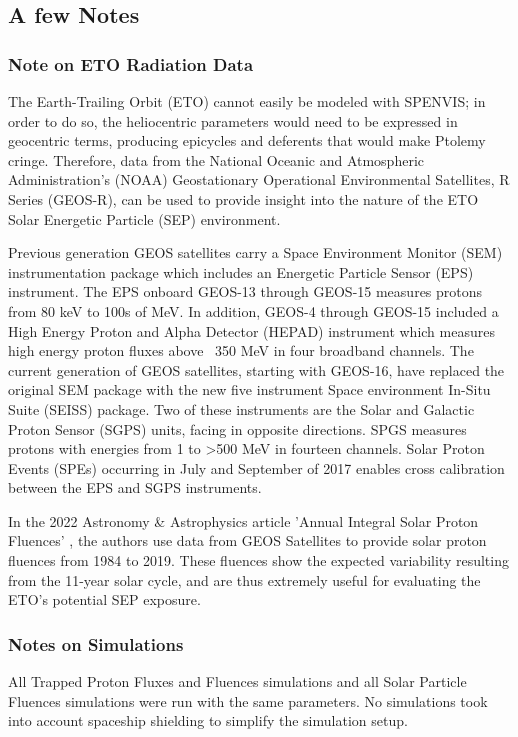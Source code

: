 \documentclass[11pt]{article}
\begin{document}
\subsection{A few Notes}

\subsubsection{Note on ETO Radiation Data}
\label{sec:ETORadData}

The Earth-Trailing Orbit (ETO) cannot easily be modeled with SPENVIS; in order to do so, the heliocentric  parameters would need to be expressed in geocentric terms, producing epicycles and deferents that would make Ptolemy cringe. Therefore, data from the National Oceanic and Atmospheric Administration's (NOAA) Geostationary Operational Environmental Satellites, R Series (GEOS-R), can be used to provide insight into the nature of the ETO Solar Energetic Particle (SEP) environment.

Previous generation GEOS satellites carry a Space Environment Monitor (SEM) instrumentation package which includes an Energetic Particle Sensor (EPS) instrument. The EPS onboard GEOS-13 through GEOS-15 measures protons from 80 keV to 100s of MeV. In addition, GEOS-4 through GEOS-15 included a High Energy Proton and Alpha Detector (HEPAD) instrument which measures high energy proton fluxes above ~350 MeV in four broadband channels.\cite{kress21} The current generation of GEOS satellites, starting with GEOS-16, have replaced the original SEM package with the new five instrument Space environment In-Situ Suite (SEISS) package. Two of these instruments are the Solar and Galactic Proton Sensor (SGPS) units, facing in opposite directions. SPGS measures protons with energies from 1 to >500 MeV in fourteen channels. Solar Proton Events (SPEs) occurring in July and September of 2017 enables cross calibration between the EPS and SGPS instruments.\cite{kress21}

In the 2022 Astronomy \& Astrophysics article 'Annual Integral Solar Proton Fluences' \cite{Raukunen22}, the authors use data from GEOS Satellites to provide solar proton fluences from 1984 to 2019. These fluences show the expected variability resulting from the 11-year solar cycle, and are thus extremely useful for evaluating the ETO's potential SEP exposure.

\subsubsection{Notes on Simulations}
\label{sec:notes}
All Trapped Proton Fluxes and Fluences simulations and all Solar Particle Fluences simulations were run with the same parameters. No simulations took into account spaceship shielding to simplify the simulation setup.
\end{document}
